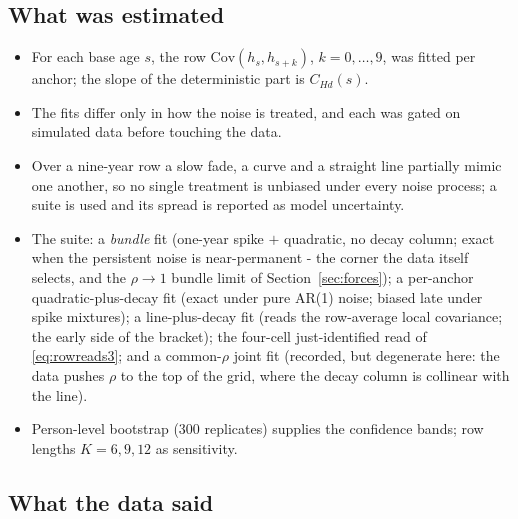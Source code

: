 \documentclass[11pt]{article}
\theoremstyle{remark}
\newcommand{\Cov}{\mathrm{Cov}}
\begin{document}
\subsection*{What was estimated}

\begin{itemize}
\item For each base age $s$, the row $\Cov(h_s,h_{s+k})$, $k=0,\dots,9$, was fitted per anchor; the slope of the deterministic part is $C_{Hd}(s)$.
\item The fits differ only in how the noise is treated, and each was gated on simulated data before touching the data.
\item Over a nine-year row a slow fade, a curve and a straight line partially mimic one another, so no single treatment is unbiased under every noise process; a suite is used and its spread is reported as model uncertainty.
\item The suite: a \emph{bundle} fit (one-year spike $+$ quadratic, no decay column; exact when the persistent noise is near-permanent - the corner the data itself selects, and the $\rho\to1$ bundle limit of Section~\ref{sec:forces}); a per-anchor quadratic-plus-decay fit (exact under pure AR(1) noise; biased late under spike mixtures); a line-plus-decay fit (reads the row-average local covariance; the early side of the bracket); the four-cell just-identified read of \eqref{eq:rowreads3}; and a common-$\rho$ joint fit (recorded, but degenerate here: the data pushes $\rho$ to the top of the grid, where the decay column is collinear with the line).
\item Person-level bootstrap (300 replicates) supplies the confidence bands; row lengths $K=6,9,12$ as sensitivity.
\end{itemize}

\subsection*{What the data said}
\end{document}
